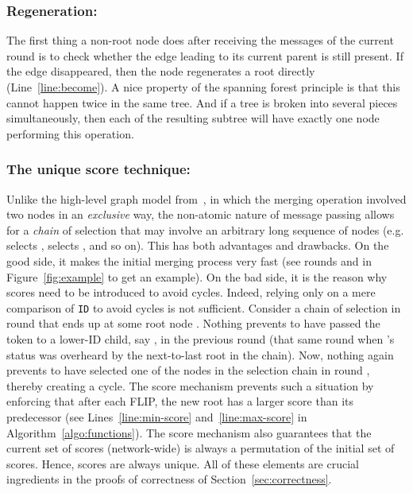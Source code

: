 \documentclass[twocolumn]{article}
\begin{document}
\subsubsection{Regeneration:} The first thing a non-root node does after receiving the messages of the current round is to check whether the edge leading to its current parent is still present. If the edge disappeared, then the node regenerates a root directly (Line~\ref{line:become}). A nice property of the spanning forest principle is that this cannot happen twice in the same tree. And if a tree is broken into several pieces simultaneously, then each of the resulting subtree will have exactly one node performing this operation.


\subsubsection{The unique score technique:}
Unlike the high-level graph model from~\cite{CCGP13}, in which the merging operation involved two nodes in an {\em exclusive} way, the non-atomic nature of message passing allows for a {\em chain} of selection that may involve an arbitrary long sequence of nodes (e.g.  selects ,  selects , and so on). This has both advantages and drawbacks. On the good side, it makes the initial merging process very fast (see rounds  and  in Figure~\ref{fig:example} to get an example). On the bad side, it is the reason why scores need to be introduced to avoid cycles. Indeed, relying only on a mere comparison of {\tt ID} to avoid cycles is not sufficient. Consider a chain of selection in round  that ends up at some root node . Nothing prevents  to have passed the token to a lower-ID child, say , in the previous round  (that same round when 's status  was overheard by the next-to-last root in the chain). Now, nothing again prevents  to have selected one of the nodes in the selection chain in round , thereby creating a cycle. The score mechanism prevents such a situation by enforcing that after each FLIP, the new root has a larger score than its predecessor (see Lines~\ref{line:min-score} and~\ref{line:max-score} in Algorithm~\ref{algo:functions}). The score mechanism also guarantees that the current set of scores (network-wide) is always a permutation of the initial set of scores. Hence, scores are always unique. All of these elements are crucial ingredients in the proofs of correctness of Section~\ref{sec:correctness}.
\end{document}
